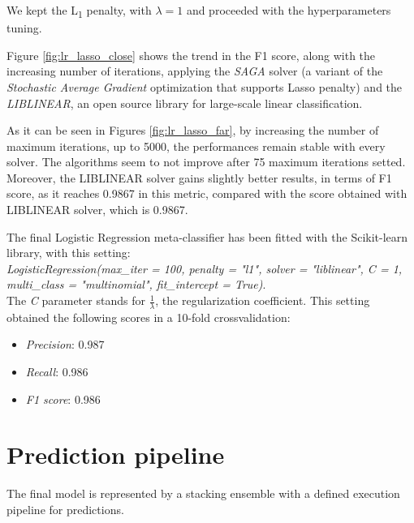 We kept the L\textsubscript{1} penalty, with $ \lambda  = 1 $   and proceeded with the hyperparameters tuning.

Figure \ref{fig:lr_lasso_close} shows the trend in the F1 score, along with the increasing number of iterations, applying the \textit{SAGA}\cite{SAGA} solver (a variant of the \textit{Stochastic Average Gradient}\cite{SAG} optimization that supports Lasso penalty) and the \textit{LIBLINEAR}\cite{Liblinear}, an open source library for large-scale linear classification.

As it can be seen in Figures \ref{fig:lr_lasso_far}, by increasing the number of maximum iterations, up to 5000, the performances remain stable with every solver.
The algorithms seem to not improve after 75 maximum iterations setted.
Moreover, the LIBLINEAR solver gains slightly better results, in terms of F1 score, as it reaches 0.9867 in this metric, compared with the score obtained with LIBLINEAR solver, which is 0.9867.

The final Logistic Regression meta-classifier has been fitted with the Scikit-learn library, with this setting:\\
\textit{LogisticRegression(max\_iter = 100, penalty = "l1", solver = "liblinear", C = 1, multi\_class = "multinomial", fit\_intercept = True)}.\\
The \textit{C} parameter stands for $ \frac{1}{\lambda} $, the regularization coefficient.
This setting obtained the following scores in a 10-fold crossvalidation:
\begin{itemize}
	\item[\PencilRight] \textit{Precision}: 0.987
	\item[\PencilRight] \textit{Recall}: 0.986
	\item[\PencilRight] \textit{F1 score}: 0.986
\end{itemize}
\section{Prediction pipeline}
\label{predicion_pipeline}
The final model is represented by a stacking ensemble with a defined execution pipeline for predictions.

